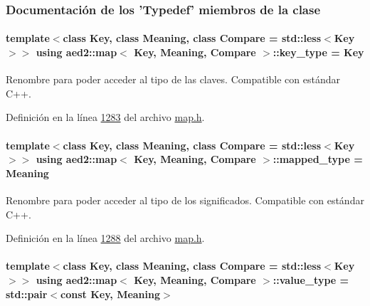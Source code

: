 \subsubsection{Documentación de los 'Typedef' miembros de la clase}
\hypertarget{classaed2_1_1map_a4273e8812e7105a618df58a2c8b72b7d_a4273e8812e7105a618df58a2c8b72b7d}{
\paragraph[{key\-\_\-type}]{\setlength{\rightskip}{0pt plus 5cm}template$<$class Key, class Meaning, class Compare = std\-::less$<$\-Key$>$$>$ using {\bf aed2\-::map}$<$ Key, Meaning, Compare $>$\-::{\bf key\-\_\-type} =  Key}}\label{classaed2_1_1map_a4273e8812e7105a618df58a2c8b72b7d_a4273e8812e7105a618df58a2c8b72b7d}


Renombre para poder acceder al tipo de las claves. Compatible con estándar C++. 



Definición en la línea \hyperlink{map_8h_source_l01283}{1283} del archivo \hyperlink{map_8h_source}{map.\-h}.

\hypertarget{classaed2_1_1map_aa3e34bf624f3009884a71b18f4ddae40_aa3e34bf624f3009884a71b18f4ddae40}{
\paragraph[{mapped\-\_\-type}]{\setlength{\rightskip}{0pt plus 5cm}template$<$class Key, class Meaning, class Compare = std\-::less$<$\-Key$>$$>$ using {\bf aed2\-::map}$<$ Key, Meaning, Compare $>$\-::{\bf mapped\-\_\-type} =  Meaning}}\label{classaed2_1_1map_aa3e34bf624f3009884a71b18f4ddae40_aa3e34bf624f3009884a71b18f4ddae40}


Renombre para poder acceder al tipo de los significados. Compatible con estándar C++. 



Definición en la línea \hyperlink{map_8h_source_l01288}{1288} del archivo \hyperlink{map_8h_source}{map.\-h}.

\hypertarget{classaed2_1_1map_a719db98e0ff9a837610f76be33264680_a719db98e0ff9a837610f76be33264680}{
\paragraph[{value\-\_\-type}]{\setlength{\rightskip}{0pt plus 5cm}template$<$class Key, class Meaning, class Compare = std\-::less$<$\-Key$>$$>$ using {\bf aed2\-::map}$<$ Key, Meaning, Compare $>$\-::{\bf value\-\_\-type} =  std\-::pair$<$const Key, Meaning$>$}}\label{classaed2_1_1map_a719db98e0ff9a837610f76be33264680_a719db98e0ff9a837610f76be33264680}


